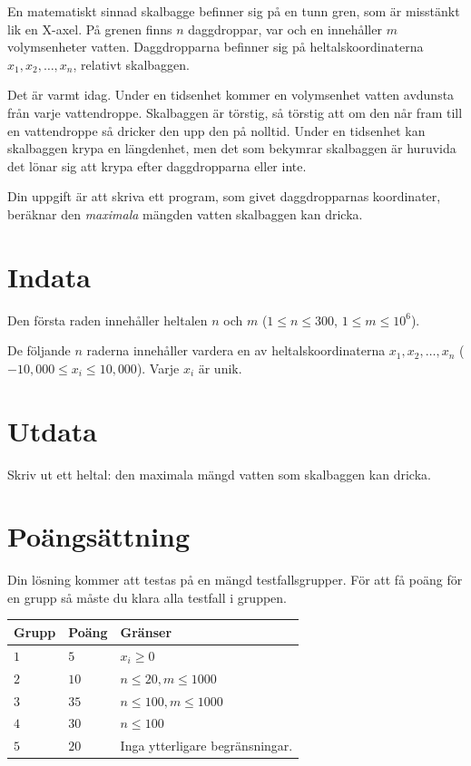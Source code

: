 
En matematiskt sinnad skalbagge befinner sig på en tunn gren, som är misstänkt lik en X-axel. På grenen finns $n$ daggdroppar, var och en innehåller $m$ volymsenheter vatten. Daggdropparna befinner sig på heltalskoordinaterna $x_1, x_2, \dots, x_n$, relativt skalbaggen.

Det är varmt idag. Under en tidsenhet kommer en volymsenhet vatten avdunsta från varje vattendroppe. Skalbaggen är törstig, så törstig att om den når fram till en vattendroppe så dricker den upp den på nolltid. Under en tidsenhet kan skalbaggen krypa en längdenhet, men det som bekymrar skalbaggen är huruvida det lönar sig att krypa efter daggdropparna eller inte.

Din uppgift är att skriva ett program, som givet daggdropparnas koordinater, beräknar den \emph{maximala} mängden vatten skalbaggen kan dricka.

\section*{Indata}
Den första raden innehåller heltalen $n$ och $m$ ($1 \le n \le 300$, $1 \le m \le 10^6$).

De följande $n$ raderna innehåller vardera en av heltalskoordinaterna $x_1, x_2, \dots, x_n$ ($-10{,}000 \le x_i \le 10{,}000$).
Varje $x_i$ är unik.

\section*{Utdata}
Skriv ut ett heltal: den maximala mängd vatten som skalbaggen kan dricka.

\section*{Poängsättning}
Din lösning kommer att testas på en mängd testfallsgrupper.
För att få poäng för en grupp så måste du klara alla testfall i gruppen.

\noindent
\begin{tabular}{| l | l | p{12cm} |}
  \hline
  \textbf{Grupp} & \textbf{Poäng} & \textbf{Gränser} \\ \hline
  $1$    & $5$         & $x_i \geq 0$ \\ \hline
  $2$    & $10$        & $n \leq 20, m \leq 1000$ \\ \hline
  $3$    & $35$        & $n \leq 100, m \leq 1000$ \\ \hline
  $4$    & $30$        & $n \leq 100$  \\ \hline
  $5$    & $20$        & Inga ytterligare begränsningar.  \\ \hline
\end{tabular}
